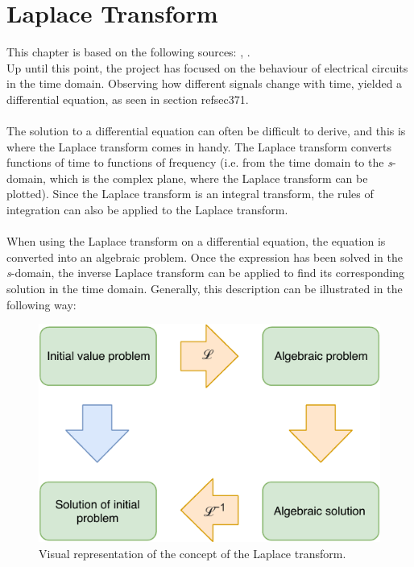 \chapter{Laplace Transform}
This chapter is based on the following sources: \cite{calc}, \cite{diffandcomplex}. \\
Up until this point, the project has focused on the behaviour of electrical circuits in the time domain. Observing how different signals change with time, yielded a differential equation, as seen in section ref{sec371}.
\\ \\
The solution to a differential equation can often be difficult to derive, and this is where the Laplace transform comes in handy. The Laplace transform converts functions of time to functions of frequency (i.e. from the time domain to the \textit{s}-domain, which is the complex plane, where the Laplace transform can be plotted). Since the Laplace transform is an integral transform, the rules of integration can also be applied to the Laplace transform.
\\ \\
\noindent When using the Laplace transform on a differential equation, the equation is converted into an algebraic problem. Once the expression has been solved in the \textit{s}-domain, the inverse Laplace transform can be applied to find its corresponding solution in the time domain. Generally, this description can be illustrated in the following way:
\begin{figure}[H]
\center
\includegraphics[scale=1]{fig/img/laplace_circ.pdf}
\caption{Visual representation of the concept of the Laplace transform.}
\label{lpsol}
\end{figure}

